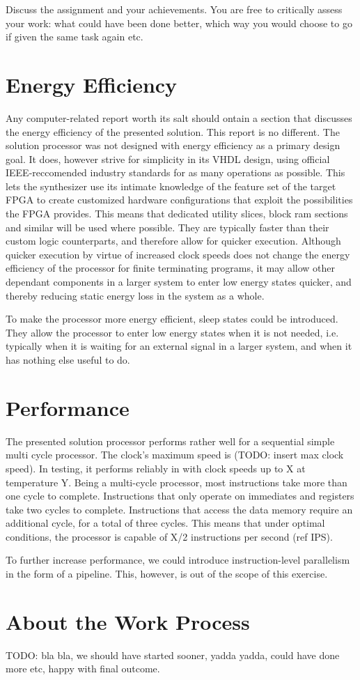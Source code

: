 Discuss the assignment and your achievements.
You are free to critically assess your work:
what could have been done better, which way you would choose to go if given the same task again etc.

\section{Energy Efficiency}

Any computer-related report worth its salt should ontain a section that discusses the energy efficiency of the presented solution.
This report is no different.
The solution processor was not designed with energy efficiency as a primary design goal.
It does, however strive for simplicity in its VHDL design, using official IEEE-reccomended industry standards for as many operations as possible.
This lets the synthesizer use its intimate knowledge of the feature set of the target FPGA to create customized hardware configurations that exploit the possibilities the FPGA provides.
This means that dedicated utility slices, block ram sections and similar will be used where possible.
They are typically faster than their custom logic counterparts, and therefore allow for quicker execution.
Although quicker execution by virtue of increased clock speeds does not change the energy efficiency of the processor for finite terminating programs, it may allow other dependant components in a larger system to enter low energy states quicker, and thereby reducing static energy loss in the system as a whole.

To make the processor more energy efficient, sleep states could be introduced.
They allow the processor to enter low energy states when it is not needed, i.e. typically when it is waiting for an external signal in a larger system, and when it has nothing else useful to do.


\section{Performance}

The presented solution processor performs rather well for a sequential simple multi cycle processor.
The clock's maximum speed is (TODO: insert max clock speed).
In testing, it performs reliably in with clock speeds up to X at temperature Y.
Being a multi-cycle processor, most instructions take more than one cycle to complete.
Instructions that only operate on immediates and registers take two cycles to complete.
Instructions that access the data memory require an additional cycle, for a total of three cycles.
This means that under optimal conditions, the processor is capable of X/2 instructions per second (ref IPS).

To further increase performance, we could introduce instruction-level parallelism in the form of a pipeline.
This, however, is out of the scope of this exercise.


\section{About the Work Process}

TODO: bla bla, we should have started sooner, yadda yadda, could have done more etc, happy with final outcome.
